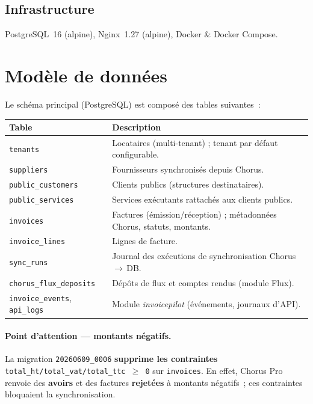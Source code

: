 \documentclass[11pt,a4paper]{article}
\newcommand{\code}[1]{\texttt{\small #1}}
\begin{document}
\subsection{Infrastructure}
PostgreSQL~16 (alpine), Nginx~1.27 (alpine), Docker \& Docker Compose.

\section{Modèle de données}

Le schéma principal (PostgreSQL) est composé des tables suivantes~:

\begin{longtable}{p{4cm} p{11cm}}
\toprule
\textbf{Table} & \textbf{Description} \\
\midrule
\endhead
\code{tenants} & Locataires (multi-tenant) ; tenant par défaut configurable. \\
\code{suppliers} & Fournisseurs synchronisés depuis Chorus. \\
\code{public\_customers} & Clients publics (structures destinataires). \\
\code{public\_services} & Services exécutants rattachés aux clients publics. \\
\code{invoices} & Factures (émission/réception) ; métadonnées Chorus, statuts, montants. \\
\code{invoice\_lines} & Lignes de facture. \\
\code{sync\_runs} & Journal des exécutions de synchronisation Chorus\,$\rightarrow$\,DB. \\
\code{chorus\_flux\_deposits} & Dépôts de flux et comptes rendus (module Flux). \\
\code{invoice\_events}, \code{api\_logs} & Module \emph{invoicepilot} (événements, journaux d'API). \\
\bottomrule
\end{longtable}

\paragraph{Point d'attention --- montants négatifs.}
La migration \code{20260609\_0006} \textbf{supprime les contraintes}
\code{total\_ht/total\_vat/total\_ttc $\geq$ 0} sur \code{invoices}. En effet,
Chorus Pro renvoie des \textbf{avoirs} et des factures \textbf{rejetées} à
montants négatifs~; ces contraintes bloquaient la synchronisation.
\end{document}
